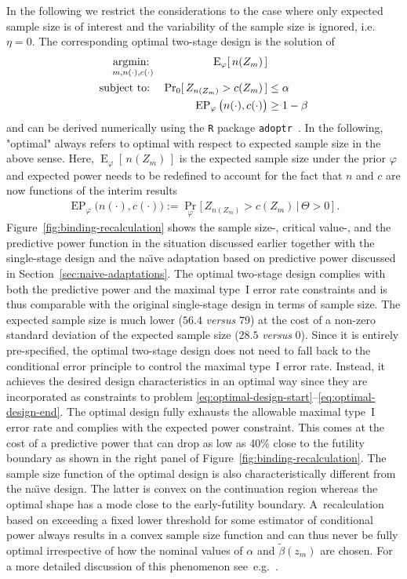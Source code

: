 \documentclass[12pt]{article}
\renewcommand{\Pr}{\operatorname{Pr}}
\newcommand{\E}{\ensuremath{\operatorname{E}}}
\newcommand{\st}{\operatorname{subject\ to:\ }}
\newcommand{\argmin}[1]{\operatornamewithlimits{argmin:\ }_{#1}}
\newcommand{\EP}{\ensuremath{\operatorname{EP}}}
\renewcommand{\Pr}{\ensuremath{\operatorname{Pr}}}
\begin{document}
In the following we restrict the considerations to the case
where only expected sample size is of interest and the variability of the sample size is
ignored, i.e.~$\eta=0$.
The corresponding optimal two-stage design is the solution of
\begin{align}
    \argmin{m, n(\cdot), c(\cdot)}
        &&                                   \E_\varphi[\,n(Z_m)\,] & \label{eq:optimal-design-start}\\
    \st &&                 \Pr_{0}[\,Z_{n(Z_m)} > c(Z_m)\,] & \leq \alpha \\
        &&     \EP_\varphi\big(n(\cdot), c(\cdot)\big) & \geq 1 - \beta \label{eq:optimal-design-end}
\end{align}
and can be derived numerically using the \texttt{R} package \texttt{adoptr}~\cite{adoptrjss2020}.
In the following, "optimal" always refers to optimal with respect to expected sample size in the above sense.
Here, $\E_\varphi[\,n(Z_m)\,]$ is the expected sample size under the prior $\varphi$ and expected power needs to be redefined to account for the
fact that $n$ and $c$ are now functions of the interim results
\begin{align}
    \EP_\varphi\big(n(\cdot), c(\cdot)\big) :=
    \Pr_\varphi\big[\,Z_{n(Z_m)}>c(Z_m)\,|\,\Theta>0\,\big] \ .
\end{align}
Figure~\ref{fig:binding-recalculation} shows the sample size-, critical value-, and the predictive power function in the situation discussed earlier together with the single-stage design
and the na\"{\i}ve adaptation based on predictive power discussed in
Section~\ref{sec:naive-adaptations}.
The optimal two-stage design complies with both the predictive power and the maximal type~I error rate constraints and is thus comparable with the original single-stage design in terms of sample size.
The expected sample size is much lower ($56.4$ \emph{versus} $79$) at the cost of a non-zero standard deviation of the expected sample size ($28.5$ \emph{versus} $0$).
Since it is entirely pre-specified,
the optimal two-stage design does not need to fall back to the conditional error principle to control the maximal type~I error rate.
Instead, it achieves the desired design characteristics in an optimal way since they are incorporated as constraints to problem \eqref{eq:optimal-design-start}--\eqref{eq:optimal-design-end}.
The optimal design fully exhausts the allowable maximal type~I error rate
and complies with the expected power constraint.
This comes at the cost of a predictive power that can drop as low as 40\% close to the futility boundary
as shown in the right panel of Figure~\ref{fig:binding-recalculation}.
The sample size function of the optimal design is also
characteristically different from the na\"{\i}ve design.
The latter is convex on the continuation region whereas the optimal
shape has a mode close to the early-futility boundary.
A~recalculation based on exceeding a fixed lower threshold for
some estimator of conditional power always results in a convex
sample size function and can thus never be fully optimal irrespective of how the nominal values of $\alpha$ and $\widetilde{\beta}(z_m)$
are chosen.
For a more detailed discussion of this phenomenon see~e.g.~\citep{pilz2019,brannath2004}.
\end{document}
